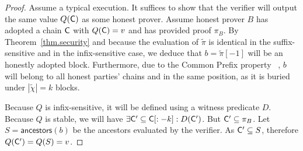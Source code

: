\begin{proof}
Assume a typical execution. It suffices to show that the verifier will output
the same value $Q(\mathsf{C})$ as some honest prover. Assume honest prover $B$ has
adopted a chain $\mathsf{C}$ with $Q(\mathsf{C}) = v$ and has provided proof
$\pi_B$. By Theorem~\ref{thm.security} and because the evaluation of $\tilde\pi$
is identical in the suffix-sensitive and in the infix-sensitive case, we deduce
that $b = \tilde\pi[-1]$ will be an honestly adopted block. Furthermore, due to
the Common Prefix property~ \cite{backbone}, $b$ will belong to all honest
parties' chains and in the same position, as it is buried under $|\tilde\chi| =
k$ blocks.

Because $Q$ is infix-sensitive, it will be defined using a witness predicate
$D$. Because $Q$ is stable, we will have $\exists \mathsf{C}' \subseteq
\mathsf{C}[:-k]: D(\mathsf{C}')$. But $\mathsf{C}' \subseteq \pi_B$. Let $S =
\textsf{ancestors}(b)$ be the ancestors evaluated by the verifier. As $\mathsf{C}'
\subseteq S$, therefore $Q(\mathsf{C}') = Q(S) = v$.
\end{proof}

